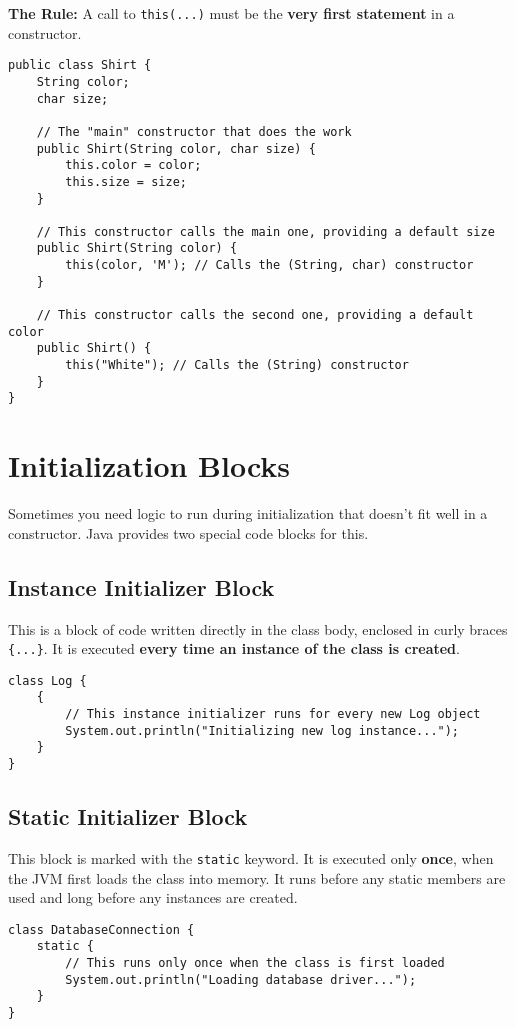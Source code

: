 \documentclass[12pt]{article}
\begin{document}
\begin{enumerate}[label=(\arabic*)]
\textbf{The Rule:} A call to \texttt{this(...)} must be the \textbf{very first statement} in a constructor.

\begin{verbatim}
public class Shirt {
    String color;
    char size;

    // The "main" constructor that does the work
    public Shirt(String color, char size) {
        this.color = color;
        this.size = size;
    }

    // This constructor calls the main one, providing a default size
    public Shirt(String color) {
        this(color, 'M'); // Calls the (String, char) constructor
    }

    // This constructor calls the second one, providing a default color
    public Shirt() {
        this("White"); // Calls the (String) constructor
    }
}
\end{verbatim}

\section{Initialization Blocks}
Sometimes you need logic to run during initialization that doesn't fit well in a constructor. Java provides two special code blocks for this.

\subsection*{Instance Initializer Block}
This is a block of code written directly in the class body, enclosed in curly braces \texttt{\{...\}}. It is executed \textbf{every time an instance of the class is created}.
\begin{verbatim}
class Log {
    {
        // This instance initializer runs for every new Log object
        System.out.println("Initializing new log instance...");
    }
}
\end{verbatim}

\subsection*{Static Initializer Block}
This block is marked with the \texttt{static} keyword. It is executed only \textbf{once}, when the JVM first loads the class into memory. It runs before any static members are used and long before any instances are created.
\begin{verbatim}
class DatabaseConnection {
    static {
        // This runs only once when the class is first loaded
        System.out.println("Loading database driver...");
    }
}
\end{verbatim}


\end{enumerate}
\end{document}
